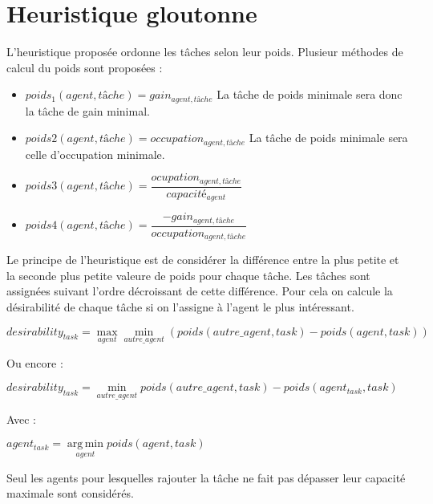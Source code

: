 \documentclass{article}
\begin{document}
\section{Heuristique gloutonne}

L'heuristique proposée ordonne les tâches selon leur poids. Plusieur méthodes
de calcul du poids sont proposées :

\begin{itemize}
    \item $poids_1 (agent,tâche) = gain_{agent,tâche}$
    La tâche de poids minimale sera donc la tâche de gain minimal.

    \item $poids2 (agent,tâche) = occupation_{agent, tâche}$
    La tâche de poids minimale sera celle d'occupation  minimale.

    \item $poids3 (agent,tâche) =
        \dfrac{ocupation_{agent,tâche}}{capacité_{agent}}$

    
    \item $poids4 (agent,tâche) =
        \dfrac{-gain_{agent,tâche}}{occupation_{agent,tâche}}$

\end{itemize}

Le principe de l'heuristique est de considérer la différence entre la plus petite et la seconde plus petite valeure de poids pour chaque tâche. Les tâches sont assignées suivant l'ordre décroissant de cette différence.
Pour cela on calcule la désirabilité de chaque tâche si on l'assigne à l'agent le plus intéressant.

$desirability_{task} = \max\limits_{agent}\min\limits_{autre\_agent}(poids(autre\_agent,task) - poids(agent,task))$

Ou encore :

$desirability_{task} = \min\limits_{autre\_agent}poids(autre\_agent,task) - poids(agent_{task},task)$

Avec :

$agent_{task} = \operatorname*{arg\,min}\limits_{agent}poids(agent,task)$

Seul les agents pour lesquelles rajouter la tâche ne fait pas dépasser leur capacité maximale sont considérés.
\end{document}
